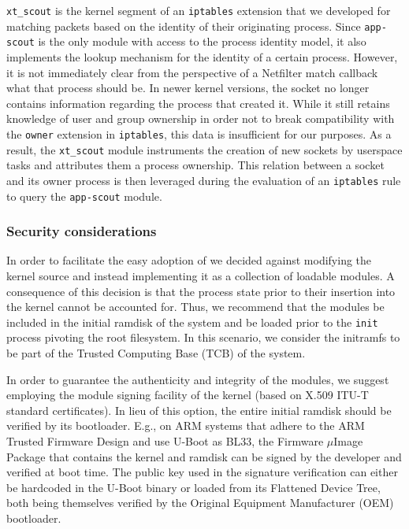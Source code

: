 \texttt{xt\_scout} is the kernel segment of an \texttt{iptables} extension that
we developed for matching packets based on the identity of their originating
process. Since \texttt{app-scout} is the only module with access to the process
identity model, it also implements the lookup mechanism for the identity of a
certain process. However, it is not immediately clear from the perspective of a
Netfilter match callback what that process should be. In newer kernel versions,
the socket no longer contains information regarding the process that created it.
While it still retains knowledge of user and group ownership in order not to
break compatibility with the \texttt{owner} extension in \texttt{iptables}, this
data is insufficient for our purposes. As a result, the \texttt{xt\_scout}
module instruments the creation of new sockets by userspace tasks and attributes
them a process ownership. This relation between a socket and its owner process
is then leveraged during the evaluation of an \texttt{iptables} rule to query
the \texttt{app-scout} module.


\subsubsection{Security considerations}

In order to facilitate the easy adoption of \scout{} we decided against
modifying the kernel source and instead implementing it as a collection of
loadable modules. A consequence of this decision is that the process state prior
to their insertion into the kernel cannot be accounted for. Thus, we recommend
that the \scout{} modules be included in the initial ramdisk of the system and
be loaded prior to the \texttt{init} process pivoting the root filesystem. In
this scenario, we consider the initramfs to be part of the Trusted Computing
Base (TCB) of the system.

In order to guarantee the authenticity and integrity of the modules, we suggest
employing the module signing facility of the kernel (based on X.509 ITU-T
standard certificates). In lieu of this option, the entire initial ramdisk
should be verified by its bootloader. E.g., on ARM systems that adhere to the
ARM Trusted Firmware Design and use U-Boot as BL33, the Firmware $\mu{}$Image
Package that contains the kernel and ramdisk can be signed by the developer and
verified at boot time. The public key used in the signature verification can
either be hardcoded in the U-Boot binary or loaded from its Flattened Device
Tree, both being themselves verified by the Original Equipment Manufacturer
(OEM) bootloader.

